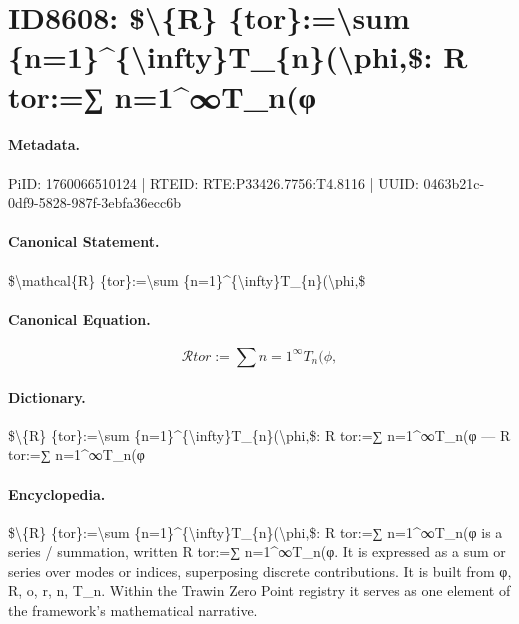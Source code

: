 \section*{ID8608: \$\textbackslash{}\{R\} \{tor\}:=\textbackslash{}sum \{n=1\}\textasciicircum{}\{\textbackslash{}infty\}T\_\{n\}(\textbackslash{}phi,\$: R tor:=∑ n=1\textasciicircum{}∞T\_n(φ}
\paragraph{Metadata.}
PiID: 1760066510124 | RTEID: RTE:P33426.7756:T4.8116 | UUID: 0463b21c-0df9-5828-987f-3ebfa36ecc6b

\paragraph{Canonical Statement.}
\$\textbackslash{}mathcal\{R\} \{tor\}:=\textbackslash{}sum \{n=1\}\textasciicircum{}\{\textbackslash{}infty\}T\_\{n\}(\textbackslash{}phi,\$

\paragraph{Canonical Equation.}
\[
\mathcal{R} {tor}:=\sum {n=1}^{\infty}T_{n}(\phi,
\]

\paragraph{Dictionary.}
\$\textbackslash{}\{R\} \{tor\}:=\textbackslash{}sum \{n=1\}\textasciicircum{}\{\textbackslash{}infty\}T\_\{n\}(\textbackslash{}phi,\$: R tor:=∑ n=1\textasciicircum{}∞T\_n(φ — R tor:=∑ n=1\textasciicircum{}∞T\_n(φ

\paragraph{Encyclopedia.}
\$\textbackslash{}\{R\} \{tor\}:=\textbackslash{}sum \{n=1\}\textasciicircum{}\{\textbackslash{}infty\}T\_\{n\}(\textbackslash{}phi,\$: R tor:=∑ n=1\textasciicircum{}∞T\_n(φ is a series / summation, written R tor:=∑ n=1\textasciicircum{}∞T\_n(φ. It is expressed as a sum or series over modes or indices, superposing discrete contributions. It is built from φ, R, o, r, n, T\_n. Within the Trawin Zero Point registry it serves as one element of the framework's mathematical narrative.
